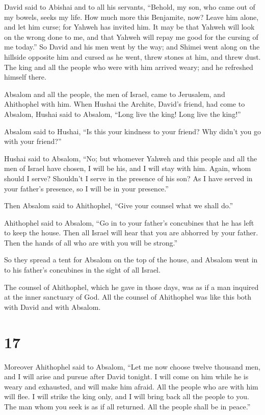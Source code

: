  David said to Abishai and to all his servants, ``Behold,
my son, who came out of my bowels, seeks my life. How much more this
Benjamite, now? Leave him alone, and let him curse; for Yahweh has
invited him.  It may be that Yahweh will look on the wrong
done to me, and that Yahweh will repay me good for the cursing of me
today.''  So David and his men went by the way; and Shimei
went along on the hillside opposite him and cursed as he went, threw
stones at him, and threw dust.  The king and all the people
who were with him arrived weary; and he refreshed himself there.

 Absalom and all the people, the men of Israel, came to
Jerusalem, and Ahithophel with him.  When Hushai the
Archite, David's friend, had come to Absalom, Hushai said to Absalom,
``Long live the king! Long live the king!''

 Absalom said to Hushai, ``Is this your kindness to your
friend? Why didn't you go with your friend?''

 Hushai said to Absalom, ``No; but whomever Yahweh and this
people and all the men of Israel have chosen, I will be his, and I will
stay with him.  Again, whom should I serve? Shouldn't I
serve in the presence of his son? As I have served in your father's
presence, so I will be in your presence.''

 Then Absalom said to Ahithophel, ``Give your counsel what
we shall do.''

 Ahithophel said to Absalom, ``Go in to your father's
concubines that he has left to keep the house. Then all Israel will hear
that you are abhorred by your father. Then the hands of all who are with
you will be strong.''

 So they spread a tent for Absalom on the top of the house,
and Absalom went in to his father's concubines in the sight of all
Israel.

 The counsel of Ahithophel, which he gave in those days,
was as if a man inquired at the inner sanctuary of God. All the counsel
of Ahithophel was like this both with David and with Absalom.

\hypertarget{section-16}{%
\section{17}\label{section-16}}

 Moreover Ahithophel said to Absalom, ``Let me now choose
twelve thousand men, and I will arise and pursue after David tonight.
 I will come on him while he is weary and exhausted, and
will make him afraid. All the people who are with him will flee. I will
strike the king only,  and I will bring back all the people
to you. The man whom you seek is as if all returned. All the people
shall be in peace.''

